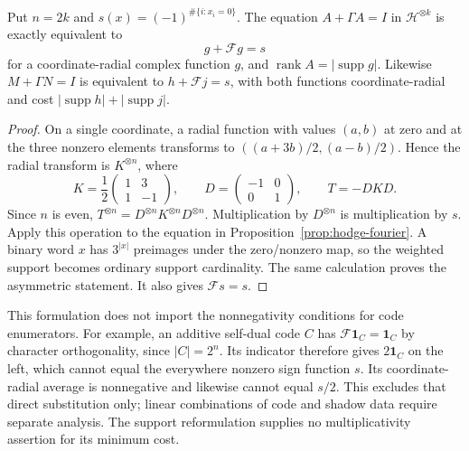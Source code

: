 \begin{corollary}
\label{cor:hodge-fourier-sparsity}
Put $n=2k$ and $s(x)=(-1)^{\#\{i:x_i=0\}}$.
The equation $A+\Gamma A=I$ in $\mathcal H^{\otimes k}$ is
exactly equivalent to
\[
 g+\mathcal Fg=s
\]
for a coordinate-radial complex function $g$, and
$\operatorname{rank}A=|\operatorname{supp}g|$.
Likewise $M+\Gamma N=I$ is equivalent to
$h+\mathcal Fj=s$, with both functions coordinate-radial and
cost $|\operatorname{supp}h|+|\operatorname{supp}j|$.
\end{corollary}

\begin{proof}
On a single coordinate, a radial function with values $(a,b)$
at zero and at the three nonzero elements transforms to
$((a+3b)/2,(a-b)/2)$. Hence the radial transform is
$K^{\otimes n}$, where
\[
 K=\frac12\begin{pmatrix}1&3\\1&-1\end{pmatrix},\qquad
 D=\begin{pmatrix}-1&0\\0&1\end{pmatrix},\qquad T=-DKD.
\]
Since $n$ is even, $T^{\otimes n}=D^{\otimes n}
K^{\otimes n}D^{\otimes n}$. Multiplication by $D^{\otimes n}$
is multiplication by $s$. Apply this operation to the equation
in Proposition~\ref{prop:hodge-fourier}. A binary word $x$ has
$3^{|x|}$ preimages under the zero/nonzero map, so the weighted
support becomes ordinary support cardinality. The same calculation
proves the asymmetric statement. It also gives $\mathcal Fs=s$.
\end{proof}

This formulation does not import the nonnegativity conditions for
code enumerators. For example, an additive self-dual code $C$ has
$\mathcal F\mathbf1_C=\mathbf1_C$ by character orthogonality,
since $|C|=2^n$. Its indicator therefore gives
$2\mathbf1_C$ on the left, which cannot equal the everywhere
nonzero sign function $s$. Its coordinate-radial average is
nonnegative and likewise cannot equal $s/2$. This excludes that
direct substitution only; linear combinations of code and shadow
data require separate analysis. The support reformulation supplies
no multiplicativity assertion for its minimum cost.
